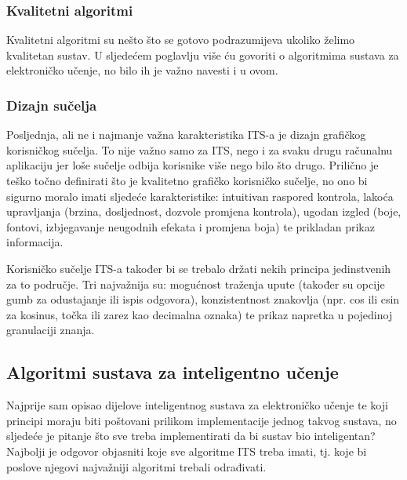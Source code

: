 \documentclass[times, utf8, zavrsni, numeric]{fer}
\begin{document}
\subsubsection{Kvalitetni algoritmi}
Kvalitetni algoritmi su nešto što se gotovo podrazumijeva ukoliko želimo kvalitetan sustav. U sljedećem poglavlju više ću govoriti o algoritmima sustava za elektroničko učenje, no bilo ih je važno navesti i u ovom.

\subsubsection{Dizajn sučelja}
Posljednja, ali ne i najmanje važna karakteristika ITS-a je dizajn grafičkog korisničkog sučelja. To nije važno samo za ITS, nego i za svaku drugu računalnu aplikaciju jer loše sučelje odbija korisnike više nego bilo što drugo. Prilično je teško točno definirati što je kvalitetno grafičko korisničko sučelje, no ono bi sigurno moralo imati sljedeće karakteristike: intuitivan raspored kontrola, lakoća upravljanja (brzina, dosljednost, dozvole promjena kontrola), ugodan izgled (boje, fontovi, izbjegavanje neugodnih efekata i promjena boja) te prikladan prikaz informacija.
\par
Korisničko sučelje ITS-a također bi se trebalo držati nekih principa jedinstvenih za to područje. Tri najvažnija su: mogućnost traženja upute (također su opcije gumb za odustajanje ili ispis odgovora), konzistentnost znakovlja (npr. cos ili csin za kosinus, točka ili zarez kao decimalna oznaka) te prikaz napretka u pojedinoj granulaciji znanja.\citep{interface}

\subsection{Algoritmi sustava za inteligentno učenje}

Najprije sam opisao dijelove inteligentnog sustava za elektroničko učenje te koji principi moraju biti poštovani prilikom implementacije jednog takvog sustava, no sljedeće je pitanje što sve treba implementirati da bi sustav bio inteligentan? Najbolji je odgovor objasniti koje sve algoritme ITS treba imati, tj. koje bi poslove njegovi najvažniji algoritmi trebali odrađivati.
\end{document}
